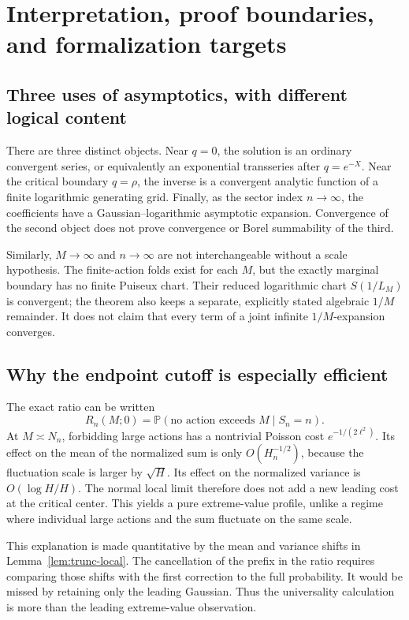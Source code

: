 \documentclass[11pt,a4paper]{article}
\numberwithin{equation}{section}
\theoremstyle{definition}
\theoremstyle{remark}
\newcommand{\Prob}{\mathbb P}
\begin{document}
\section{Interpretation, proof boundaries, and formalization targets}
\label{sec:interpretation}

\subsection{Three uses of asymptotics, with different logical content}
There are three distinct objects. Near \(q=0\), the solution is an ordinary
convergent series, or equivalently an exponential transseries after
\(q=e^{-X}\). Near the critical boundary \(q=\rho\), the inverse is a
convergent analytic function of a finite logarithmic generating grid. Finally,
as the sector index \(n\to\infty\), the coefficients have a Gaussian--logarithmic
asymptotic expansion. Convergence of the second object does not prove
convergence or Borel summability of the third.

Similarly, \(M\to\infty\) and \(n\to\infty\) are not interchangeable
without a scale hypothesis. The finite-action folds exist for each \(M\),
but the exactly marginal boundary has no finite Puiseux chart. Their reduced
logarithmic chart \(S(1/L_M)\) is convergent; the theorem also keeps a
separate, explicitly stated algebraic \(1/M\) remainder. It does not claim
that every term of a joint infinite \(1/M\)-expansion converges.

\subsection{Why the endpoint cutoff is especially efficient}
The exact ratio can be written
\[
 R_n(M;0)=\Prob(\text{no action exceeds }M\mid S_n=n).
\]
At \(M\asymp N_n\), forbidding large actions has a nontrivial Poisson cost
\(e^{-1/(2\ell^2)}\). Its effect on the mean of the normalized sum is only
\(O(H_n^{-1/2})\), because the fluctuation scale is larger by \(\sqrt H\).
Its effect on the normalized variance is \(O(\log H/H)\).
The normal local limit therefore does not add a new leading cost at the
critical center. This yields a pure extreme-value profile, unlike a regime
where individual large actions and the sum fluctuate on the same scale.

This explanation is made quantitative by the mean and variance shifts in
Lemma~\ref{lem:trunc-local}. The cancellation of the prefix in the ratio
requires comparing those shifts with the first correction to the full
probability. It would be missed by retaining only the leading Gaussian.
Thus the universality calculation is more than the leading extreme-value
observation.
\end{document}
